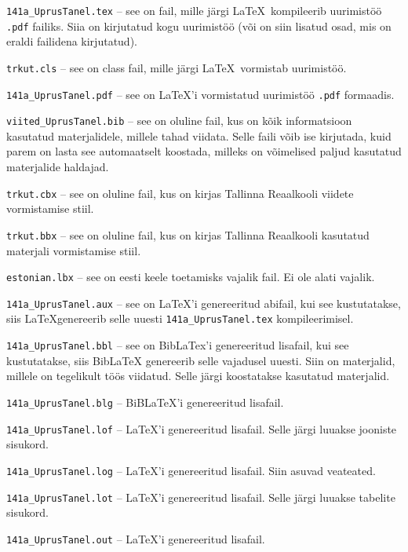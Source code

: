 \documentclass{trkut}%
\begin{document}
\verb!141a_UprusTanel.tex! -- see  on fail, mille järgi \LaTeX\ kompileerib uurimistöö \verb!.pdf! failiks. Siia on kirjutatud kogu uurimistöö (või on siin lisatud osad, mis on eraldi failidena kirjutatud).

\verb!trkut.cls! -- see  on class fail, mille järgi \LaTeX\ vormistab uurimistöö.

\verb!141a_UprusTanel.pdf! -- see on  \LaTeX'i  vormistatud uurimistöö \verb!.pdf! formaadis.

\verb!viited_UprusTanel.bib! -- see on oluline fail, kus on kõik informatsioon kasutatud materjalidele, millele tahad viidata. Selle faili võib ise kirjutada, kuid parem on lasta see automaatselt koostada, milleks on võimelised paljud kasutatud materjalide haldajad.

\verb!trkut.cbx! -- see on oluline fail, kus on kirjas Tallinna Reaalkooli viidete vormistamise stiil.

\verb!trkut.bbx! -- see on oluline fail, kus on kirjas Tallinna Reaalkooli kasutatud materjali vormistamise stiil.

\verb!estonian.lbx! -- see on eesti keele toetamisks vajalik fail. Ei ole alati vajalik.

\verb!141a_UprusTanel.aux! -- see on \LaTeX'i genereeritud abifail, kui see kustutatakse, siis \LaTeX genereerib selle uuesti \verb!141a_UprusTanel.tex! kompileerimisel. 

\verb!141a_UprusTanel.bbl! -- see on BibLaTex'i genereeritud lisafail, kui see kustutatakse, siis BibLaTeX genereerib selle vajadusel uuesti. Siin on materjalid, millele on tegelikult töös viidatud. Selle järgi koostatakse kasutatud materjalid.

\verb!141a_UprusTanel.blg! -- BiBLaTeX'i genereeritud lisafail. 

\verb!141a_UprusTanel.lof! -- \LaTeX'i genereeritud lisafail. Selle järgi luuakse jooniste sisukord.

\verb!141a_UprusTanel.log! -- \LaTeX'i genereeritud lisafail. Siin asuvad veateated.

\verb!141a_UprusTanel.lot! -- \LaTeX'i genereeritud lisafail. Selle järgi luuakse tabelite sisukord.

\verb!141a_UprusTanel.out! -- \LaTeX'i genereeritud lisafail.
\end{document}
